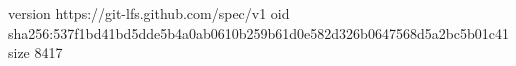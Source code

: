 version https://git-lfs.github.com/spec/v1
oid sha256:537f1bd41bd5dde5b4a0ab0610b259b61d0e582d326b0647568d5a2bc5b01c41
size 8417
